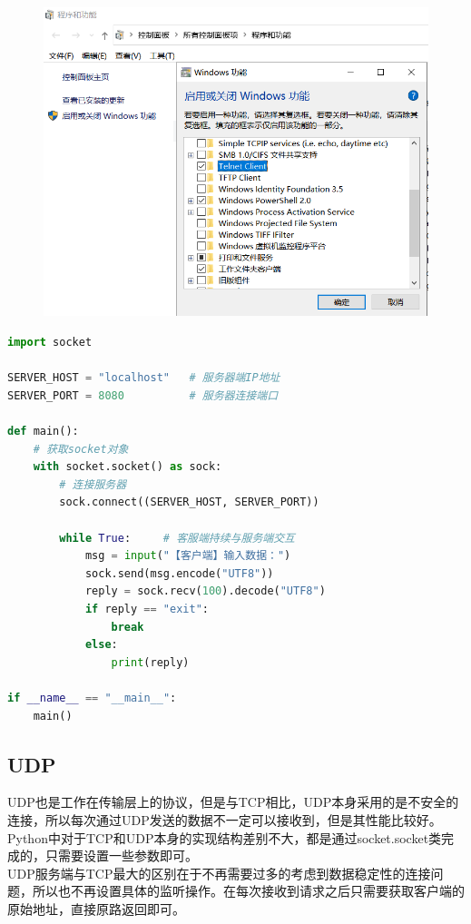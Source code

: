 \begin{figure}[H]
	\centering
	\includegraphics[scale=0.7]{img/C12/12-2/2.png}
\end{figure}

\begin{lstlisting}[language=Python, title=tcp\_client.py]
import socket

SERVER_HOST = "localhost"   # 服务器端IP地址
SERVER_PORT = 8080          # 服务器连接端口

def main():
    # 获取socket对象
    with socket.socket() as sock:
        # 连接服务器
        sock.connect((SERVER_HOST, SERVER_PORT))
        
        while True:     # 客服端持续与服务端交互
            msg = input("【客户端】输入数据：")
            sock.send(msg.encode("UTF8"))
            reply = sock.recv(100).decode("UTF8")
            if reply == "exit":
                break
            else:
                print(reply)

if __name__ == "__main__":
    main()
\end{lstlisting}

\vspace{0.5cm}

\subsection{UDP}

UDP也是工作在传输层上的协议，但是与TCP相比，UDP本身采用的是不安全的连接，所以每次通过UDP发送的数据不一定可以接收到，但是其性能比较好。\\

Python中对于TCP和UDP本身的实现结构差别不大，都是通过socket.socket类完成的，只需要设置一些参数即可。\\

UDP服务端与TCP最大的区别在于不再需要过多的考虑到数据稳定性的连接问题，所以也不再设置具体的监听操作。在每次接收到请求之后只需要获取客户端的原始地址，直接原路返回即可。

\newpage